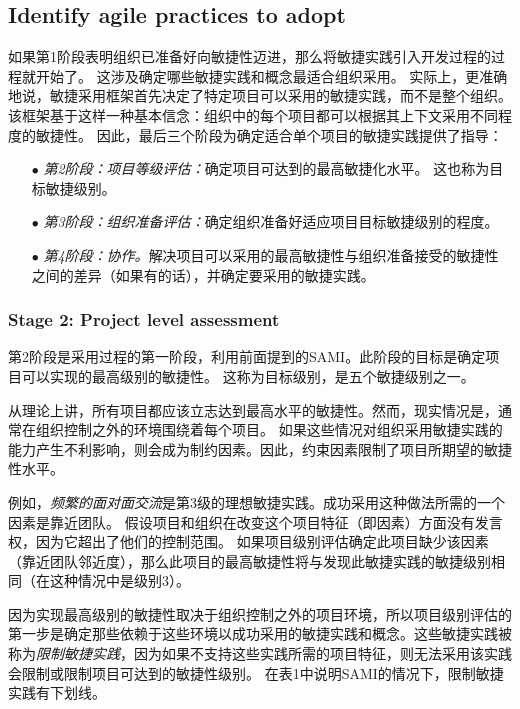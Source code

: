\documentclass[twocolumn]{svjour3}[]
\begin{document}
\subsection{Identify agile practices to adopt}

如果第1阶段表明组织已准备好向敏捷性迈进，那么将敏捷实践引入开发过程的过程就开始了。 这涉及确定哪些敏捷实践和概念最适合组织采用。 实际上，更准确地说，敏捷采用框架首先决定了特定项目可以采用的敏捷实践，而不是整个组织。 该框架基于这样一种基本信念：组织中的每个项目都可以根据其上下文采用不同程度的敏捷性。 因此，最后三个阶段为确定适合单个项目的敏捷实践提供了指导：

\begin{itemize}
    \item[$\bullet$] \textit{第2阶段：项目等级评估：}确定项目可达到的最高敏捷化水平。 这也称为目标敏捷级别。
    \item[$\bullet$] \textit{第3阶段：组织准备评估：}确定组织准备好适应项目目标敏捷级别的程度。
    \item[$\bullet$] \textit{第4阶段：协作。}解决项目可以采用的最高敏捷性与组织准备接受的敏捷性之间的差异（如果有的话），并确定要采用的敏捷实践。
\end{itemize}


\subsubsection{Stage 2: Project level assessment}
\label{section3.2.1}

第2阶段是采用过程的第一阶段，利用前面提到的SAMI。此阶段的目标是确定项目可以实现的最高级别的敏捷性。 这称为目标级别，是五个敏捷级别之一。

从理论上讲，所有项目都应该立志达到最高水平的敏捷性。然而，现实情况是，通常在组织控制之外的环境围绕着每个项目。 如果这些情况对组织采用敏捷实践的能力产生不利影响，则会成为制约因素。因此，约束因素限制了项目所期望的敏捷性水平。

例如，\textit{频繁的面对面交流}是第3级的理想敏捷实践。成功采用这种做法所需的一个因素是靠近团队。 假设项目和组织在改变这个项目特征（即因素）方面没有发言权，因为它超出了他们的控制范围。 如果项目级别评估确定此项目缺少该因素（靠近团队邻近度），那么此项目的最高敏捷性将与发现此敏捷实践的敏捷级别相同（在这种情况中是级别3）。

因为实现最高级别的敏捷性取决于组织控制之外的项目环境，所以项目级别评估的第一步是确定那些依赖于这些环境以成功采用的敏捷实践和概念。这些敏捷实践被称为\textit{限制敏捷实践}，因为如果不支持这些实践所需的项目特征，则无法采用该实践会限制或限制项目可达到的敏捷性级别。 在表1中说明SAMI的情况下，限制敏捷实践有下划线。
\end{document}
